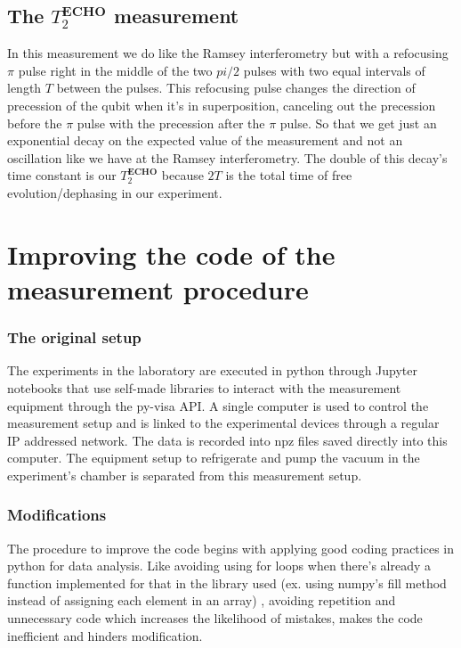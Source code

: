\documentclass[11pt,onecolumm,a4paper]{article}
\begin{document}
\subsection{The $T_2^{\textbf{ECHO}}$ measurement }
In this measurement we do like the Ramsey interferometry but with a refocusing $\pi$ pulse right in the middle of the two $pi/2$ pulses with two equal intervals of length $T$ between the pulses. This refocusing pulse changes the direction of precession of the qubit when it's in superposition, canceling out the precession before the $\pi$ pulse with the precession after the $\pi$ pulse. So that we get just an exponential decay on the expected value of the measurement and not an oscillation like we have at the Ramsey interferometry. The double of this decay's time constant is our $T_2^{\textbf{ECHO}}$ because $2T$ is the total time of free evolution/dephasing in our experiment.


\section{Improving the code of the measurement procedure}
\subsubsection{ The original setup} The experiments in the laboratory are executed in python through Jupyter notebooks that use self-made libraries to interact with the measurement equipment through the py-visa API. A single computer is used to control the measurement setup and is linked to the experimental devices through a regular IP addressed network.  The data is recorded into npz files saved directly into this computer. The equipment setup to refrigerate and pump the vacuum in the experiment's chamber is separated from this measurement setup. 

\subsubsection{Modifications} 

The procedure to improve the code begins with applying good coding practices in python for data analysis. Like avoiding using for loops when there's already a function implemented for that in the library used (ex. using numpy's fill method instead of assigning each element in an array) , avoiding repetition and unnecessary code which increases the likelihood of mistakes, makes the code inefficient and hinders modification.
\end{document}
